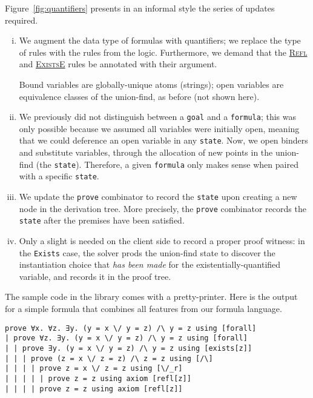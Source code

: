 \documentclass{easychair}
\def\li{\lstinline}
\let\TirName\textsc
\renewcommand{\DefTirName}[1]{\hyperlink{#1}{\TirName {#1}}}
\let\Rule\DefTirName
\newcommand{\fref}[1]{Figure~\ref{fig:#1}}
\begin{document}
\fref{quantifiers} presents in an informal style the series of updates
required.
\begin{enumerate}[i)]
  \item We augment the data type of formulas with quantifiers; we replace the
    type of rules with the rules from the logic. Furthermore, we demand that the
    \Rule{Refl} and \Rule{ExistsE} rules be annotated with their argument.

    Bound variables are globally-unique atoms (strings); open variables are
    equivalence classes of the union-find, as before (not shown here).

  \item We previously did not distinguish between a \li+goal+ and a
    \li+formula+; this was only possible because we assumed all variables were
    initially open, meaning that we could deference an open variable in any
    \li+state+. Now, we open binders and substitute variables, through the
    allocation of new points in the union-find (the \li+state+). Therefore, a
    given \li+formula+ only makes sense when paired with a specific \li+state+.

  \item We update the \li+prove+ combinator to record the \li+state+ upon
    creating a new node in the derivation tree. More precisely, the \li+prove+
    combinator records the \li+state+ after the premises have been satisfied.

  \item Only a slight is needed on the client side to record a proper proof
    witness: in the \li+Exists+ case, the solver prods the union-find state to
    discover the instantiation choice that \emph{has been made} for the
    existentially-quantified variable, and records it in the proof tree.
\end{enumerate}

The sample code in the library comes with a pretty-printer. Here is the output
for a simple formula that combines all features from our formula language.

\begin{verbatim}
prove ∀x. ∀z. ∃y. (y = x \/ y = z) /\ y = z using [forall]
| prove ∀z. ∃y. (y = x \/ y = z) /\ y = z using [forall]
| | prove ∃y. (y = x \/ y = z) /\ y = z using [exists[z]]
| | | prove (z = x \/ z = z) /\ z = z using [/\]
| | | | prove z = x \/ z = z using [\/_r]
| | | | | prove z = z using axiom [refl[z]]
| | | | prove z = z using axiom [refl[z]]
\end{verbatim}
\end{document}
